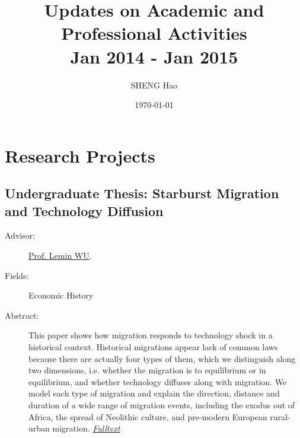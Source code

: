 \documentclass{article}
\begin{document}
\title{Updates on Academic and Professional Activities\\Jan 2014 - Jan 2015}
\author{{\normalsize SHENG Hao}}
\date{\today}

\maketitle

\def \Pr{{\rm Pr}}
\baselineskip 0.6cm
\section{Research Projects}
\subsection{Undergraduate Thesis: Starburst Migration and Technology Diffusion}
\begin{description}
\item[Advisor:] \href{http://wulemin.weebly.com/index.html}{Prof. Lemin WU}. 
\item[Fields:] Economic History
\item[Abstract:] This paper shows how migration responds to technology shock in a historical context. Historical migrations appear lack of common laws because there are actually four types of them, which we distinguish along two dimensions, i.e. whether the migration is to equilibrium or in equilibrium, and whether technology diffuses along with migration. We model each type of migration and explain the direction, distance and duration of a wide range of migration events, including the exodus out of Africa, the spread of Neolithic culture, and pre-modern European rural-urban migration. {\it \href{http://shenghao.weebly.com/uploads/2/4/2/1/24218782/writingsample2migration_shenghao.pdf}{Fulltext}}\\

\end{description}
\end{document}
